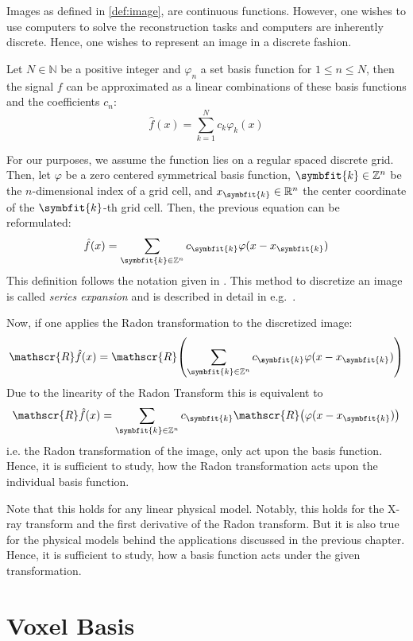 Images as defined in \ref{def:image}, are continuous functions. However, one wishes to use computers
to solve the reconstruction tasks and computers are inherently discrete. Hence, one wishes to
represent an image in a discrete fashion.

\begin{definition}
	\label{def:permissible_representation}
	Let \(N \in \mathbb{N}\) be a positive integer and \(\varphi_n\) a set basis function for
	\(1 \leq n \leq N\), then the signal \(f\) can be approximated as a linear combinations
	of these basis functions and the coefficients \(c_n\):
	\[ \hat{f}(x) = \sum_{k=1}^{N} c_k \varphi_k(x) \]
\end{definition}

For our purposes, we assume the function lies on a regular spaced discrete grid. Then, let
\(\varphi\) be a zero centered symmetrical basis function, \(\symbfit{k} \in \mathbb{Z}^n\) be the
\(n\)-dimensional index of a grid cell, and \(x_{\symbfit{k}} \in \mathbb{R}^n\) the center coordinate
of the \(\symbfit{k}\)-th grid cell. Then, the previous equation can be reformulated:
\[ \hat{f}(x) = \sum_{\symbfit{k} \in \mathbb{Z}^n} c_{\symbfit{k}} \varphi(x - x_{\symbfit{k}}) \]
This definition follows the notation given in \cite{momey_new_2011}. This method to discretize an
image is called \textit{series expansion} and is described in detail in
e.g.~\cite{herman_basis_2015}.

Now, if one applies the Radon transformation to the discretized image: 
\[ \mathscr{R}\hat{f}(x) = \mathscr{R}\left( \sum_{\symbfit{k} \in \mathbb{Z}^n} c_{\symbfit{k}} \varphi(x - x_{\symbfit{k}}) \right) \]
Due to the linearity of the Radon Transform this is equivalent to \[ \mathscr{R}\hat{f}(x) =  \sum_{\symbfit{k} \in \mathbb{Z}^n} c_{\symbfit{k}}\mathscr{R}\left( \varphi(x - x_{\symbfit{k}}) \right) \]
i.e. the Radon transformation of the image, only act upon the basis function. Hence, it is
sufficient to study, how the Radon transformation acts upon the individual basis function.

Note that this holds for any linear physical model. Notably, this holds for the X-ray transform and
the first derivative of the Radon transform. But it is also true for the physical models behind the
applications discussed in the previous chapter. Hence, it is sufficient to study, how a basis
function acts under the given transformation.

\section{Voxel Basis}\label{sec:voxel_basis}

